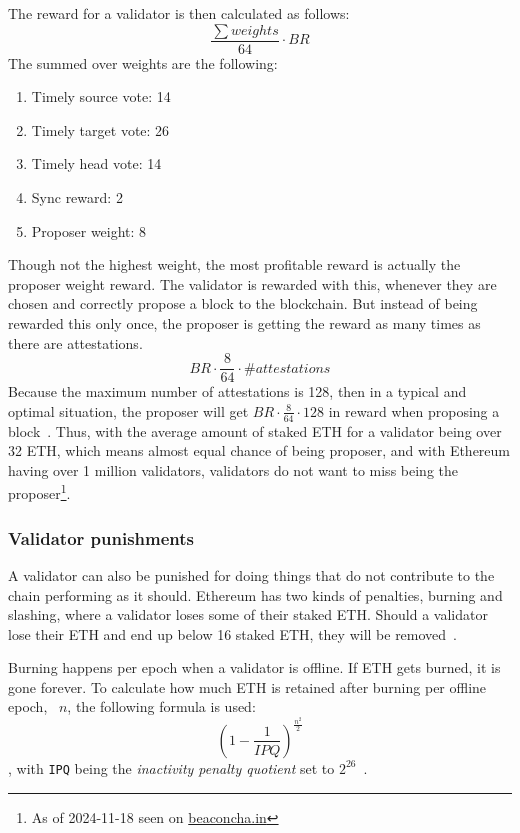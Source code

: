 The reward for a validator is then calculated as follows:
\begin{equation}
    \frac{\sum{weights}}{64}\cdot BR
    \label{eq:valrewards}
\end{equation}
The summed over weights are the following:
\begin{enumerate}
    \item Timely source vote: 14
    \item Timely target vote: 26
    \item Timely head vote: 14
    \item Sync reward: 2
    \item Proposer weight: 8
\end{enumerate}
Though not the highest weight, the most profitable reward is actually the proposer weight reward.
The validator is rewarded with this, whenever they are chosen and correctly propose a block to the blockchain.
But instead of being rewarded this only once,
the proposer is getting the reward as many times as there are attestations.
\begin{equation}
    BR\cdot\frac{8}{64}\cdot \#attestations\label
    {eq:propreward}
\end{equation}
Because the maximum number of attestations is 128,
then in a typical and optimal situation,
the proposer will get $BR\cdot\frac{8}{64}\cdot128$ in reward
when proposing a block~\cite{PoSRewAndPen,consensus-spec-phase-0}.
Thus, with the average amount of staked ETH for a validator being over 32 ETH, which means almost equal chance of being proposer, and with Ethereum having over 1 million validators, validators do not want to miss being the proposer\footnote{As of 2024-11-18 seen on \href{https://beaconcha.in/}{beaconcha.in}}.

\subsubsection{Validator punishments}\label{subsubsec:valpunish}
A validator can also be punished for doing things that do not contribute to the chain performing as it should.
Ethereum has two kinds of penalties, burning and slashing, where a validator loses some of their staked ETH\@.
Should a validator lose their ETH and end up below 16 staked ETH, they will be removed~\cite{consensus-spec-phase-0}.


Burning happens per epoch when a validator is offline.
If ETH gets burned, it is gone forever.
To calculate how much ETH is retained after burning per offline epoch, ~$n$, the following formula is used:
\begin{equation}
    \left(1-\frac{1}{IPQ}\right)^\frac{n^2}{2}
    \label{eq:burn}
\end{equation},
with \texttt{IPQ} being the \textit{inactivity penalty quotient} set to $2^{26}$~\cite{consensus-spec-phase-0}.


